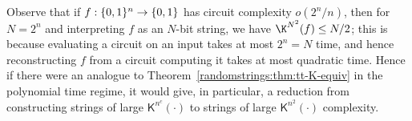 Observe that if $f: \{0,1\}^n\to \{0,1\}$ has circuit complexity $o(2^n/n)$, then for $N= 2^n$ and interpreting $f$ as an $N$-bit string, we have $\K^{N^2}(f) \leq N/2$; this is because evaluating a circuit on an input takes at most $2^n = N$ time, and hence reconstructing $f$ from a circuit computing it takes at most quadratic time. Hence if there were an analogue to Theorem~\ref{randomstrings:thm:tt-K-equiv} in the polynomial time regime, it would give, in particular, a reduction from constructing strings of large $\mathsf{K}^{n^c}(\cdot) $ to strings of large $\mathsf{K}^{n^2}(\cdot)$ complexity.

